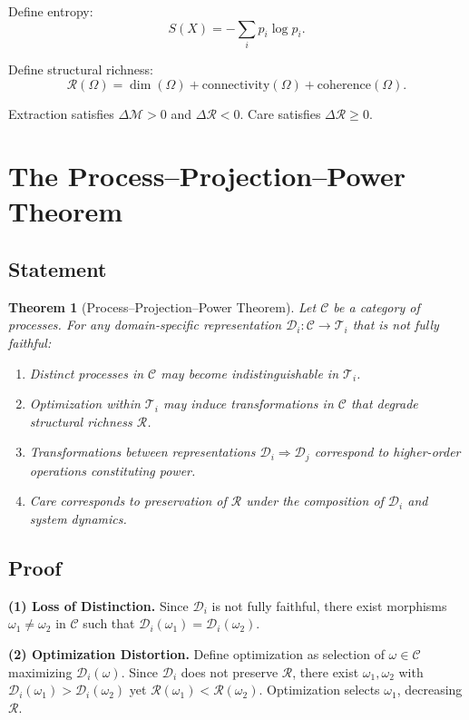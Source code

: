 \documentclass[11pt,a4paper]{article}
\newtheorem{theorem}{Theorem}[section]
\theoremstyle{definition}
\theoremstyle{remark}
\begin{document}
Define entropy:
\[
S(X) = -\sum_i p_i \log p_i.
\]

Define structural richness:
\[
\mathcal{R}(\Omega) = \dim(\Omega) + \mathrm{connectivity}(\Omega) + \mathrm{coherence}(\Omega).
\]

Extraction satisfies $\Delta \mathcal{M} > 0$ and $\Delta \mathcal{R} < 0$. Care satisfies $\Delta \mathcal{R} \geq 0$.

\section{The Process--Projection--Power Theorem}

\subsection{Statement}

\begin{theorem}[Process--Projection--Power Theorem]
Let $\mathcal{C}$ be a category of processes. For any domain-specific representation $\mathcal{D}_i : \mathcal{C} \to \mathcal{T}_i$ that is not fully faithful:
\begin{enumerate}
\item Distinct processes in $\mathcal{C}$ may become indistinguishable in $\mathcal{T}_i$.
\item Optimization within $\mathcal{T}_i$ may induce transformations in $\mathcal{C}$ that degrade structural richness $\mathcal{R}$.
\item Transformations between representations $\mathcal{D}_i \Rightarrow \mathcal{D}_j$ correspond to higher-order operations constituting power.
\item Care corresponds to preservation of $\mathcal{R}$ under the composition of $\mathcal{D}_i$ and system dynamics.
\end{enumerate}
\end{theorem}

\subsection{Proof}

\textbf{(1) Loss of Distinction.} Since $\mathcal{D}_i$ is not fully faithful, there exist morphisms $\omega_1 \neq \omega_2$ in $\mathcal{C}$ such that $\mathcal{D}_i(\omega_1) = \mathcal{D}_i(\omega_2)$.

\textbf{(2) Optimization Distortion.} Define optimization as selection of $\omega \in \mathcal{C}$ maximizing $\mathcal{D}_i(\omega)$. Since $\mathcal{D}_i$ does not preserve $\mathcal{R}$, there exist $\omega_1, \omega_2$ with $\mathcal{D}_i(\omega_1) > \mathcal{D}_i(\omega_2)$ yet $\mathcal{R}(\omega_1) < \mathcal{R}(\omega_2)$. Optimization selects $\omega_1$, decreasing $\mathcal{R}$.
\end{document}
